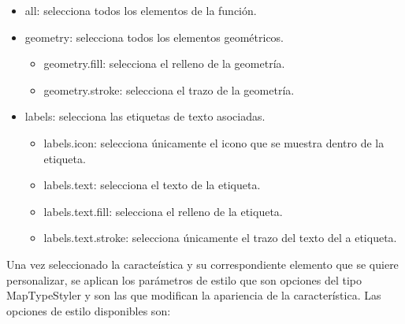 \begin{itemize}

\item all: selecciona todos los elementos de la función.

\item geometry: selecciona todos los elementos geométricos.

\begin{itemize}

\item geometry.fill: selecciona el relleno de la geometría.

\item geometry.stroke: selecciona el trazo de la geometría.


\end{itemize}

\item labels: selecciona las etiquetas de texto asociadas.

\begin{itemize}

\item labels.icon: selecciona únicamente el icono que se muestra dentro de la etiqueta.

\item labels.text: selecciona el texto de la etiqueta.

\item labels.text.fill: selecciona el relleno de la etiqueta.

\item labels.text.stroke: selecciona únicamente el trazo del texto del a etiqueta.

\end{itemize}

\end{itemize}

\vspace{5 mm}

Una vez seleccionado la caracteística y su correspondiente elemento que se quiere personalizar, se aplican los parámetros de estilo que son opciones del tipo MapTypeStyler y son las que modifican la apariencia de la característica. Las opciones de estilo disponibles son:

